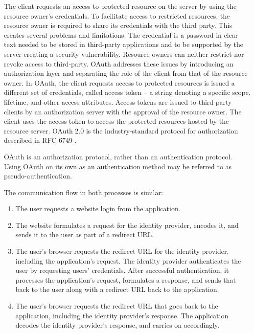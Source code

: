 \begin{multicols}{2}
The client requests an access to protected resource on the server by using the resource owner's credentials. To facilitate access to restricted resources, the resource owner is required to share its credentials with the third party. This creates several problems and limitations. The credential is a password in clear text needed to be stored in third-party applications and to be supported by the server creating a security vulnerability. Resource owners can neither restrict nor revoke access to third-party. OAuth addresses these issues by introducing an authorization layer and separating the role of the client from that of the resource owner. In OAuth, the client requests access to protected resources is issued a different set of credentials, called access token -- a string denoting a specific scope, lifetime, and other access attributes. Access tokens are issued to third-party clients by an authorization server with the  approval of the resource owner. The client uses the access token to access the protected resources hosted by the resource server. OAuth 2.0 is the industry-standard protocol for authorization described in RFC 6749 \cite{chap2-key21}.

OAuth is an authorization protocol, rather than an authentication protocol. Using OAuth on its own as an authentication method may be referred to as pseudo-authentication. 

The communication flow in both processes is similar:
\begin{enumerate}
\item The user requests a website login from the application.
\item The website formulates a request for the identity provider, encodes it, and sends it to the user as part of a redirect URL.
\item The user's browser requests the redirect URL for the identity provider, including the application's request. The identity provider authenticates the user by requesting users' credentials. After successful authentication, it processes the application's request, formulates a response, and sends that back to the user along with a redirect URL back to the application.
\item The user's browser requests the redirect URL that goes back to the application, including the identity provider's response. The application decodes the identity provider's response, and carries on accordingly. 
\end{enumerate}


\end{multicols}
